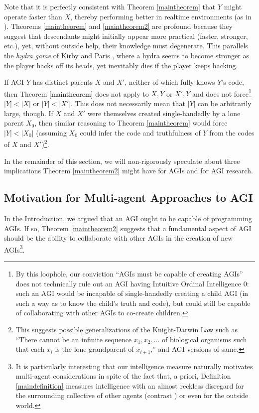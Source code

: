 \documentclass[runningheads]{llncs}
\begin{document}
Note that it is perfectly consistent with
Theorem \ref{maintheorem} that $Y$ might operate faster
than $X$, thereby performing better in realtime environments (as in \cite{gavane}).
Theorems \ref{maintheorem} and \ref{maintheorem2} are profound because
they suggest that descendants might initially appear more practical
(faster, stronger, etc.),
yet, without outside help, their knowledge must degenerate.
This parallels the \emph{hydra game} of
Kirby and Paris \cite{kirby1982accessible}, where a hydra
seems to become stronger as the player hacks off its heads, yet
inevitably dies if the player keeps hacking.

If AGI $Y$ has distinct parents $X$ and $X'$, neither of which fully knows
$Y$'s code, then Theorem \ref{maintheorem} does not apply to $X,Y$ or $X',Y$ and
does not force\footnote{By this loophole, our conviction ``AGIs must be capable of creating
AGIs'' does not technically rule out an AGI having Intuitive Ordinal Intelligence $0$:
such an AGI would be incapable of single-handedly creating a child AGI (in such a way as
to know the child's truth and code), but could still be capable of collaborating with
other AGIs to co-create
children.} $|Y|<|X|$ or $|Y|<|X'|$. This does not necessarily mean that
$|Y|$ can be arbitrarily large, though. If $X$ and $X'$ were themselves
created single-handedly by a lone parent $X_0$, then similar
reasoning to Theorem \ref{maintheorem} would force $|Y|<|X_0|$ (assuming $X_0$
could infer the code and truthfulness of $Y$ from the codes of $X$ and $X'$)\footnote{This
suggests possible generalizations of the Knight-Darwin Law such as ``There cannot be
an infinite sequence $x_1,x_2,\ldots$ of biological organisms such that each $x_i$
is the lone grandparent of $x_{i+1}$,'' and AGI versions of same.}.

In the remainder of this section, we will non-rigorously speculate about three implications
Theorem \ref{maintheorem2} might have for AGIs and for AGI research.


\subsection{Motivation for Multi-agent Approaches to AGI}

In the Introduction, we argued that an AGI ought to be
capable of programming AGIs. If so, Theorem \ref{maintheorem2} suggests
that a fundamental aspect of AGI should be the ability to collaborate with other
AGIs in the creation of new AGIs\footnote{It is particularly interesting that our
intelligence measure naturally motivates multi-agent considerations in spite of
the fact that, a priori, Definition \ref{maindefinition} measures intelligence
with an almost reckless disregard for the surrounding collective of other agents
(contrast \cite{hernandez2011more}) or even for the outside world.}.
\end{document}
